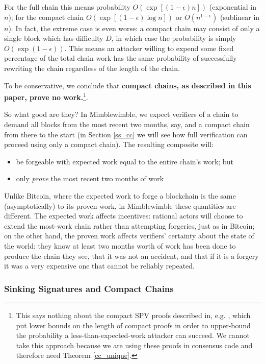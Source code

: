 \documentclass[letterpaper]{article}
\begin{document}
For the full chain this means probability $O(\exp[(1 - \epsilon)n])$ (exponential
in $n$); for the compact chain $O(\exp[(1 - \epsilon)\log n])$ or
$O(n^{1-\epsilon})$ (sublinear in $n$).
In fact, the extreme case is even worse: a compact chain may consist of
only a single block which has difficulty $D$, in which case the probability
is simply $O(\exp(1 - \epsilon))$. This means an attacker willing to expend
some fixed percentage of the total chain work has the same probability of
successfully rewriting the chain regardless of the length of the chain.

To be conservative, we conclude that \textbf{compact chains, as described
in this paper, prove no work.}\footnote{This says nothing about the compact
SPV proofs described in, e.g. \cite{kiayias+lamprou+stouka2016}, which put lower bounds
on the length of compact proofs in order to upper-bound the probability
a less-than-expected-work attacker can succeed. We cannot take this approach
because we are using these proofs in consensus code and therefore need
Theorem \ref{cc_unique}.}.

So what good are they? In Mimblewimble, we expect verifiers of a chain to
demand all blocks from the most recent two months, say, and a compact chain
from there to the start (in Section \ref{ss_cc} we will see how full verification
can proceed using only a compact chain). The resulting composite will:
\begin{itemize}
\item be forgeable with expected work equal to the entire chain's work; but
\item only \emph{prove} the most recent two months of work
\end{itemize}
Unlike Bitcoin, where the expected work to forge a blockchain is the same
(asymptotically) to its proven work, in Mimblewimble these quantities are
different. The expected work affects incentives: rational actors will choose
to extend the most-work chain rather than attempting forgeries, just as in
Bitcoin; on the other hand, the proven work affects verifiers' certainty
about the state of the world: they know at least two months worth of work
has been done to produce the chain they see, that it was not an accident,
and that if it is a forgery it was a very expensive one that cannot be
reliably repeated.

\subsubsection{Sinking Signatures and Compact Chains\label{ss_cc}}
\end{document}
